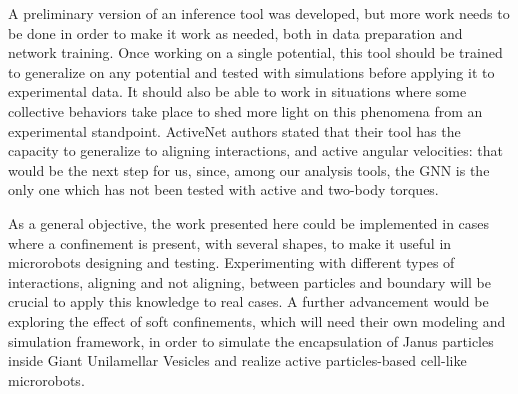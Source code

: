 \documentclass[../../master_thesis_np.tex]{subfiles}
\begin{document}
A preliminary version of an inference tool was developed, but more work needs to be done in order to make it work as needed, both in data preparation and network training.
Once working on a single potential, this tool should be trained to generalize on any potential and tested with simulations before applying it to experimental data.
It should also be able to work in situations where some collective behaviors take place to shed more light on this phenomena from an experimental standpoint.
ActiveNet \cite{ruiz-garcia_discovering_2024} authors stated that their tool has the capacity to generalize to aligning interactions, and active angular velocities: that would be the next step for us, since, among our analysis tools, the GNN is the only one which has not been tested with active and two-body torques.

As a general objective, the work presented here could be implemented in cases where a confinement is present, with several shapes, to make it useful in microrobots designing and testing.
Experimenting with different types of interactions, aligning and not aligning, between particles and boundary will be crucial to apply this knowledge to real cases.
A further advancement would be exploring the effect of soft confinements, which will need their own modeling and simulation framework, in order to simulate the encapsulation of Janus particles inside Giant Unilamellar Vesicles and realize active particles-based cell-like microrobots.

\end{document}

